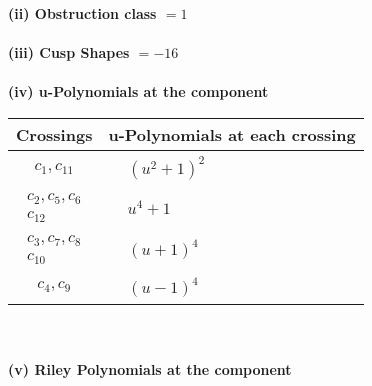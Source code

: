 \documentclass[1p]{elsarticle_modified}
\theoremstyle{definition}
\begin{document}
\flushleft \textbf{(ii) Obstruction class $= 1$}\\~\\
\flushleft \textbf{(iii) Cusp Shapes $= -16$}\\~\\
\newpage\renewcommand{\arraystretch}{1}
\flushleft \textbf{(iv) u-Polynomials at the component}\newline \\
\begin{tabular}{m{50pt}|m{274pt}}
Crossings & \hspace{64pt}u-Polynomials at each crossing \\
\hline $$\begin{aligned}c_{1},c_{11}\end{aligned}$$&$\begin{aligned}
&(u^2+1)^2
\end{aligned}$\\
\hline $$\begin{aligned}c_{2},c_{5},c_{6}\\c_{12}\end{aligned}$$&$\begin{aligned}
&u^4+1
\end{aligned}$\\
\hline $$\begin{aligned}c_{3},c_{7},c_{8}\\c_{10}\end{aligned}$$&$\begin{aligned}
&(u+1)^4
\end{aligned}$\\
\hline $$\begin{aligned}c_{4},c_{9}\end{aligned}$$&$\begin{aligned}
&(u-1)^4
\end{aligned}$\\
\hline
\end{tabular}\\~\\
\newpage\renewcommand{\arraystretch}{1}
\flushleft \textbf{(v) Riley Polynomials at the component}\newline \\
\end{document}
